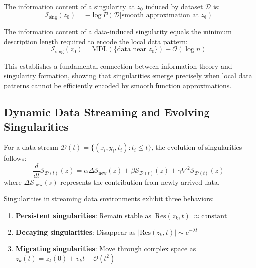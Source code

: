 \begin{definition}
The information content of a singularity at $z_0$ induced by dataset $\mathcal{D}$ is:
\begin{equation}
\mathcal{I}_{\text{sing}}(z_0) = -\log P(\mathcal{D} | \text{smooth approximation at } z_0)
\end{equation}
\end{definition}

\begin{theorem}
The information content of a data-induced singularity equals the minimum description length required to encode the local data pattern:
\begin{equation}
\mathcal{I}_{\text{sing}}(z_0) = \text{MDL}(\{\text{data near } z_0\}) + \mathcal{O}(\log n)
\end{equation}
\end{theorem}

This establishes a fundamental connection between information theory and singularity formation, showing that singularities emerge precisely when local data patterns cannot be efficiently encoded by smooth function approximations.

\subsection{Dynamic Data Streaming and Evolving Singularities}

\begin{definition}
For a data stream $\mathcal{D}(t) = \{(x_i, y_i, t_i) : t_i \leq t\}$, the evolution of singularities follows:
\begin{equation}
\frac{d}{dt} \mathcal{S}_{\mathcal{D}(t)}(z) = \alpha \Delta \mathcal{S}_{\text{new}}(z) + \beta \mathcal{S}_{\mathcal{D}(t)}(z) + \gamma \nabla^2 \mathcal{S}_{\mathcal{D}(t)}(z)
\end{equation}
where $\Delta \mathcal{S}_{\text{new}}(z)$ represents the contribution from newly arrived data.
\end{definition}

\begin{theorem}
Singularities in streaming data environments exhibit three behaviors:
\begin{enumerate}
\item \textbf{Persistent singularities}: Remain stable as $|\text{Res}(z_k, t)| \approx \text{constant}$
\item \textbf{Decaying singularities}: Disappear as $|\text{Res}(z_k, t)| \sim e^{-\lambda t}$
\item \textbf{Migrating singularities}: Move through complex space as $z_k(t) = z_k(0) + v_k t + \mathcal{O}(t^2)$
\end{enumerate}
\end{theorem}


